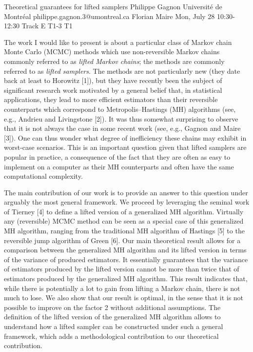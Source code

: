 \begin{talk}
  {Theoretical guarantees for lifted samplers}%
  {Philippe Gagnon}%
  {Université de Montréal}%
  {philippe.gagnon.3@umontreal.ca}%
  {Florian Maire}%
  {}%
  {Mon, July 28 10:30-12:30 Track E}%
  {T1-3}%
  {T1}%
  {}%
				
			
The work I would like to present is about a particular class of Markov chain Monte Carlo (MCMC) methods which use non-reversible Markov chains commonly referred to as \textit{lifted Markov chains}; the methods are commonly referred to as \textit{lifted samplers}. The methods are not particularly new (they date back at least to Horowitz [1]), but they have recently been the subject of significant research work motivated by a general belief that, in statistical applications, they lead to more efficient estimators than their reversible counterparts which correspond to Metropolis--Hastings (MH) algorithms (see, e.g., Andrieu and Livingstone [2]). It was thus somewhat surprising to observe that it is not always the case in some recent work (see, e.g., Gagnon and Maire [3]). One can thus wonder what degree of inefficiency these chains may exhibit in worst-case scenarios. This is an important question given that lifted samplers are popular in practice, a consequence of the fact that they are often as easy to implement on a computer as their MH counterparts and often have the same computational complexity.

The main contribution of our work is to provide an answer to this question under arguably the most general framework. We proceed by leveraging the seminal work of Tierney [4] to define a lifted version of a generalized MH algorithm. Virtually any (reversible) MCMC method can be seen as a special case of this generalized MH algorithm, ranging from the traditional MH algorithm of Hastings [5] to the reversible jump algorithm of Green [6]. Our main theoretical result allows for a comparison between the generalized MH algorithm and its lifted version in terms of the variance of produced estimators. It essentially guarantees that the variance of estimators produced by the lifted version cannot be more than twice that of estimators produced by the generalized MH algorithm. This result indicates that, while there is potentially a lot to gain from lifting a Markov chain, there is not much to lose. We also show that our result is optimal, in the sense that it is not possible to improve on the factor 2 without additional assumptions. The definition of the lifted version of the generalized MH algorithm allows to understand how a lifted sampler can be constructed under such a general framework, which adds a methodological contribution to our theoretical contribution.


\end{talk}
